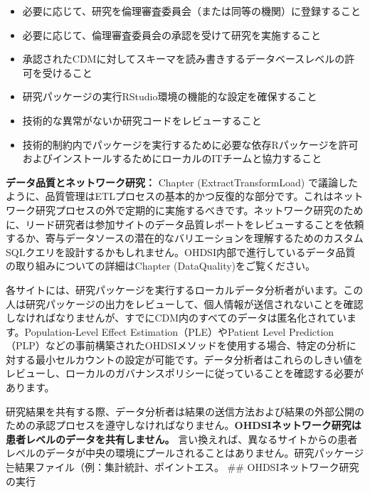 \documentclass[
  11pt]{book}
\makeatletter
\providecommand{\tightlist}{%
  \setlength{\itemsep}{0pt}\setlength{\parskip}{0pt}}
\newenvironment{kframe}{%
\medskip{}
\setlength{\fboxsep}{.8em}
 \def\at@end@of@kframe{}%
 \ifinner\ifhmode%
  \def\at@end@of@kframe{\end{minipage}}%
  \begin{minipage}{\columnwidth}%
 \fi\fi%
 \def\FrameCommand##1{\hskip\@totalleftmargin \hskip-\fboxsep
 \colorbox{myShadeColor}{##1}\hskip-\fboxsep
     \hskip-\linewidth \hskip-\@totalleftmargin \hskip\columnwidth}%
 \MakeFramed {\advance\hsize-\width
   \@totalleftmargin\z@ \linewidth\hsize
   \@setminipage}}%
 {\par\unskip\endMakeFramed%
 \at@end@of@kframe}
\newenvironment{rmdblock}[1]
  {
  \begin{itemize}
  \renewcommand{\labelitemi}{
    \raisebox{-.7\height}[0pt][0pt]{
      {\setkeys{Gin}{width=3em,keepaspectratio}\texttt{[image: images/\#1]}}
    }
  }
  \setlength{\fboxsep}{1em}
  \begin{kframe}
  \item
  }
  {
  \end{kframe}
  \end{itemize}
  }
\newenvironment{rmdimportant}
  {\begin{rmdblock}{important}}
  {\end{rmdblock}}
\theoremstyle{definition}
\theoremstyle{definition}
\theoremstyle{definition}
\theoremstyle{definition}
\theoremstyle{remark}
\makeatother
\begin{document}
\begin{itemize}
\tightlist
\item
  必要に応じて、研究を倫理審査委員会（または同等の機関）に登録すること
\item
  必要に応じて、倫理審査委員会の承認を受けて研究を実施すること
\item
  承認されたCDMに対してスキーマを読み書きするデータベースレベルの許可を受けること
\item
  研究パッケージの実行RStudio環境の機能的な設定を確保すること
\item
  技術的な異常がないか研究コードをレビューすること
\item
  技術的制約内でパッケージを実行するために必要な依存Rパッケージを許可およびインストールするためにローカルのITチームと協力すること
\end{itemize}

\begin{rmdimportant}
\textbf{データ品質とネットワーク研究：} Chapter \citet{ref}(ExtractTransformLoad) で議論したように、品質管理はETLプロセスの基本的かつ反復的な部分です。これはネットワーク研究プロセスの外で定期的に実施するべきです。ネットワーク研究のために、リード研究者は参加サイトのデータ品質レポートをレビューすることを依頼するか、寄与データソースの潜在的なバリエーションを理解するためのカスタムSQLクエリを設計するかもしれません。OHDSI内部で進行しているデータ品質の取り組みについての詳細はChapter \citet{ref}(DataQuality)をご覧ください。
\end{rmdimportant}

各サイトには、研究パッケージを実行するローカルデータ分析者がいます。この人は研究パッケージの出力をレビューして、個人情報が送信されないことを確認しなければなりませんが、すでにCDM内のすべてのデータは匿名化されています。Population-Level Effect Estimation（PLE）やPatient Level Prediction（PLP）などの事前構築されたOHDSIメソッドを使用する場合、特定の分析に対する最小セルカウントの設定が可能です。データ分析者はこれらのしきい値をレビューし、ローカルのガバナンスポリシーに従っていることを確認する必要があります。

研究結果を共有する際、データ分析者は結果の送信方法および結果の外部公開のための承認プロセスを遵守しなければなりません。\textbf{OHDSIネットワーク研究は患者レベルのデータを共有しません。} 言い換えれば、異なるサイトからの患者レベルのデータが中央の環境にプールされることはありません。研究パッケージ는結果ファイル（例：集計統計、ポイントエス。
\#\# OHDSIネットワーク研究の実行

\end{document}
